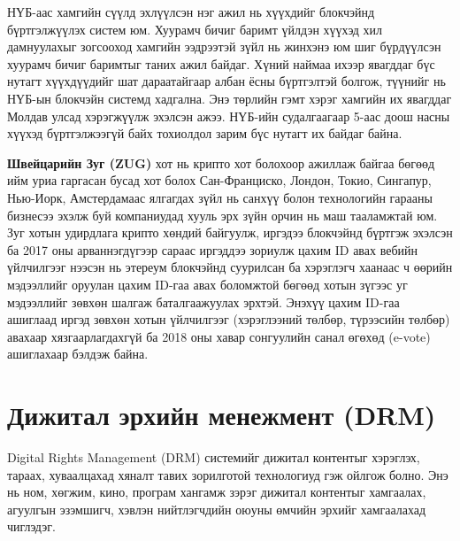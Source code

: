 НҮБ-аас хамгийн сүүлд эхлүүлсэн нэг ажил нь хүүхдийг блокчэйнд
бүртгэлжүүлэх систем юм. Хуурамч бичиг баримт үйлдэн хүүхэд хил
дамнуулахыг зогсооход хамгийн ээдрээтэй зүйл нь жинхэнэ юм шиг
бүрдүүлсэн хуурамч бичиг баримтыг таних ажил байдаг. Хүний наймаа ихээр явагддаг бүс нутагт хүүхдүүдийг шат дараатайгаар албан ёсны бүртгэлтэй болгож, түүнийг нь НҮБ-ын блокчэйн системд хадгална. Энэ төрлийн гэмт хэрэг хамгийн их явагддаг Молдав улсад хэрэгжүүлж эхэлсэн ажээ. НҮБ-ийн судалгаагаар 5-аас доош насны хүүхэд бүртгэлжээгүй байх тохиолдол зарим
бүс нутагт их байдаг байна.

\textbf{Швейцарийн Зуг (ZUG)} хот нь крипто хот болохоор ажиллаж
байгаа бөгөөд ийм уриа гаргасан бусад хот болох Сан-Франциско, Лондон, Токио, Сингапур, Нью-Иорк, Амстердамаас ялгагдах зүйл нь санхүү болон технологийн гарааны бизнесээ эхэлж буй компаниудад хууль эрх зүйн орчин нь маш тааламжтай юм. Зуг хотын удирдлага крипто хөндий байгуулж, иргэдээ блокчэйнд бүртгэж эхэлсэн ба 2017 оны арваннэгдүгээр сараас иргэддээ зориулж цахим ID авах вебийн үйлчилгээг нээсэн нь этереум
блокчэйнд суурилсан ба хэрэглэгч хаанаас ч өөрийн мэдээллийг оруулан цахим ID-гаа авах боломжтой бөгөөд хотын зүгээс уг мэдээллийг зөвхөн шалгаж баталгаажуулах эрхтэй. Энэхүү цахим ID-гаа ашиглаад иргэд зөвхөн хотын үйлчилгээг (хэрэглээний төлбөр, түрээсийн төлбөр) авахаар хязгаарлагдахгүй ба 2018 оны хавар сонгуулийн санал өгөхөд (e-vote) ашиглахаар бэлдэж байна.

\section{Дижитал эрхийн менежмент (DRM)}
Digital Rights Management (DRM) системийг дижитал контентыг хэрэглэх, тараах, хуваалцахад хяналт тавих зорилготой технологиуд гэж ойлгож болно. Энэ нь ном, хөгжим, кино, програм хангамж зэрэг дижитал контентыг хамгаалах, агуулгын эзэмшигч, хэвлэн нийтлэгчдийн оюуны өмчийн эрхийг хамгаалахад чиглэдэг.

